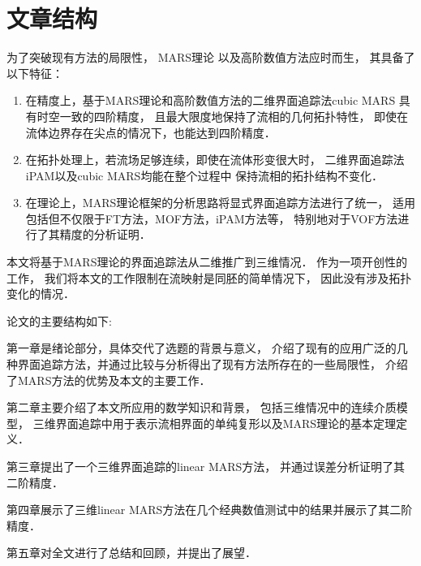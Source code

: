 \section{文章结构}

为了突破现有方法的局限性，
MARS理论\cite{zhang13:_donat_region,zhang15:_gener_donat_region,zhang19:_boolean_algebra}
以及高阶数值方法\cite{zhang17:_hfes,zhang18:cubicMARS}应时而生，
其具备了以下特征：
\begin{enumerate}
	\setlength{\itemsep}{0pt}
	\setlength{\parsep}{0pt}
	\setlength{\parskip}{0pt}
	
	\item 在精度上，基于MARS理论和高阶数值方法的二维界面追踪法cubic MARS\cite{zhang18:cubicMARS}
	具有时空一致的四阶精度，
	且最大限度地保持了流相的几何拓扑特性， 即使在流体边界存在尖点的情况下，也能达到四阶精度\cite{zhang18:cubicMARS}．
	
	\item 在拓扑处理上，若流场足够连续，即使在流体形变很大时，
	二维界面追踪法iPAM以及cubic MARS均能在整个过程中
	保持流相的拓扑结构不变化\cite{zhang18:cubicMARS}．
	
	\item 在理论上，MARS理论框架的分析思路将显式界面追踪方法进行了统一，
	适用包括但不仅限于FT方法，MOF方法\cite{ahn09:_adapt,dyadechko05:_momen,dyadechko08:_recon}，iPAM方法\cite{zhang14:iPAM}等，
	特别地对于VOF方法进行了其精度的分析证明\cite{zhang16:_mars}．
\end{enumerate}


本文将基于MARS理论的界面追踪法从二维推广到三维情况．
作为一项开创性的工作，
我们将本文的工作限制在流映射是同胚的简单情况下，
因此没有涉及拓扑变化的情况．


论文的主要结构如下:


第一章是绪论部分，具体交代了选题的背景与意义，
介绍了现有的应用广泛的几种界面追踪方法，并通过比较与分析得出了现有方法所存在的一些局限性，
介绍了MARS方法的优势及本文的主要工作．


第二章主要介绍了本文所应用的数学知识和背景，
包括三维情况中的连续介质模型，
三维界面追踪中用于表示流相界面的单纯复形以及MARS理论的基本定理定义．


第三章提出了一个三维界面追踪的linear MARS方法，
并通过误差分析证明了其二阶精度．


第四章展示了三维linear MARS方法在几个经典数值测试中的结果并展示了其二阶精度．


第五章对全文进行了总结和回顾，并提出了展望．